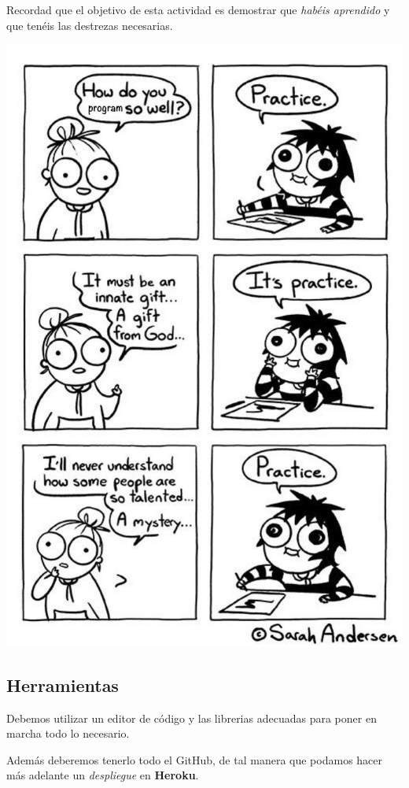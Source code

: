 \documentclass[a4paper,10pt]{article}
\begin{document}
Recordad que el objetivo de esta actividad es demostrar que \textit{habéis aprendido} y que tenéis las destrezas necesarias.

\includegraphics[width=\textwidth]{imgs/practice}

\subsection{Herramientas}

Debemos utilizar un editor de código y las librerias adecuadas para poner en marcha todo lo necesario.

Además deberemos tenerlo todo el GitHub, de tal manera que podamos hacer más adelante un \textit{despliegue} en \textbf{Heroku}.
\end{document}
